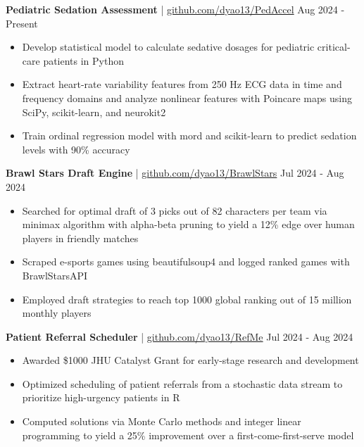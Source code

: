 \documentclass[11pt]{article}       %
\begin{document}
\textbf{Pediatric Sedation Assessment} | \href{https://github.com/dyao13/PedAccel}{github.com/dyao13/PedAccel} \hfill Aug 2024 - Present \vspace{-9pt} \\
\begin{itemize}
  \item Develop statistical model to calculate sedative dosages for pediatric critical-care patients in Python
  \item Extract heart-rate variability features from 250 Hz ECG data in time and frequency domains and analyze nonlinear features with Poincare maps using SciPy, scikit-learn, and neurokit2
  \item Train ordinal regression model with mord and scikit-learn to predict sedation levels with 90\% accuracy
\end{itemize}

\textbf{Brawl Stars Draft Engine} | \href{https://github.com/dyao13/BrawlStars}{github.com/dyao13/BrawlStars} \hfill Jul 2024 - Aug 2024 \vspace{-9pt} \\
\begin{itemize}
  \item Searched for optimal draft of 3 picks out of 82 characters per team via minimax algorithm with alpha-beta pruning to yield a 12\% edge over human players in friendly matches
  \item Scraped e-sports games using beautifulsoup4 and logged ranked games with BrawlStarsAPI
  \item Employed draft strategies to reach top 1000 global ranking out of 15 million monthly players
\end{itemize}

\textbf{Patient Referral Scheduler} | \href{https://github.com/dyao13/RefMe}{github.com/dyao13/RefMe} \hfill Jul 2024 - Aug 2024 \vspace{-9pt} \\
\begin{itemize}
  \item Awarded \$1000 JHU Catalyst Grant for early-stage research and development
  \item Optimized scheduling of patient referrals from a stochastic data stream to prioritize high-urgency patients in R
  \item Computed solutions via Monte Carlo methods and integer linear programming to yield a 25\% improvement over a first-come-first-serve model
\end{itemize}
\end{document}
